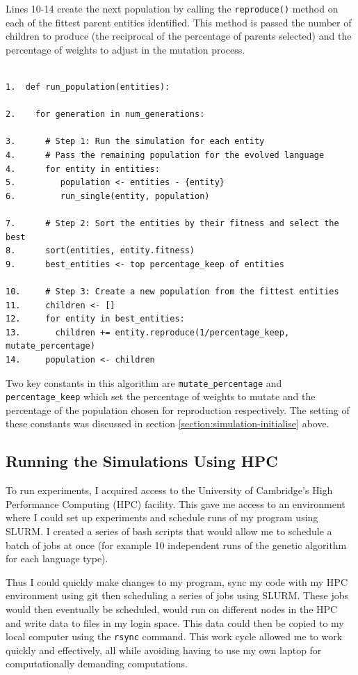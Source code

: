 \documentclass[12pt,a4paper,twoside,openright]{report}
\begin{document}
Lines 10-14 create the next population by calling the \texttt{reproduce()} method on each of the fittest parent entities identified. This method is passed the number of children to produce (the reciprocal of the percentage of parents selected) and the percentage of weights to adjust in the mutation process.

\begin{verbatim}

1.  def run_population(entities):

2.    for generation in num_generations:

3.      # Step 1: Run the simulation for each entity
4.      # Pass the remaining population for the evolved language
4.      for entity in entities:
5.         population <- entities - {entity}
6.         run_single(entity, population)
           
7.      # Step 2: Sort the entities by their fitness and select the best
8.      sort(entities, entity.fitness)
9.      best_entities <- top percentage_keep of entities

10.     # Step 3: Create a new population from the fittest entities
11.     children <- []
12.     for entity in best_entities:
13.       children += entity.reproduce(1/percentage_keep, mutate_percentage)
14.     population <- children

\end{verbatim}

Two key constants in this algorithm are \texttt{mutate\_percentage} and \texttt{percentage\_keep} which set the percentage of weights to mutate and the percentage of the population chosen for reproduction respectively. The setting of these constants was discussed in section \ref{section:simulation-initialise} above.

\subsection{Running the Simulations Using HPC}\label{section:running}

To run experiments, I acquired access to the University of Cambridge's High Performance Computing (HPC) facility. This gave me access to an environment where I could set up experiments and schedule runs of my program using SLURM. I created a series of bash scripts that would allow me to schedule a batch of jobs at once (for example 10 independent runs of the genetic algorithm for each language type).

Thus I could quickly make changes to my program, sync my code with my HPC environment using git then scheduling a series of jobs using SLURM. These jobs would then eventually be scheduled, would run on different nodes in the HPC and write data to files in my login space. This data could then be copied to my local computer using the \texttt{rsync} command. This work cycle allowed me to work quickly and effectively, all while avoiding having to use my own laptop for computationally demanding computations. 
\end{document}

